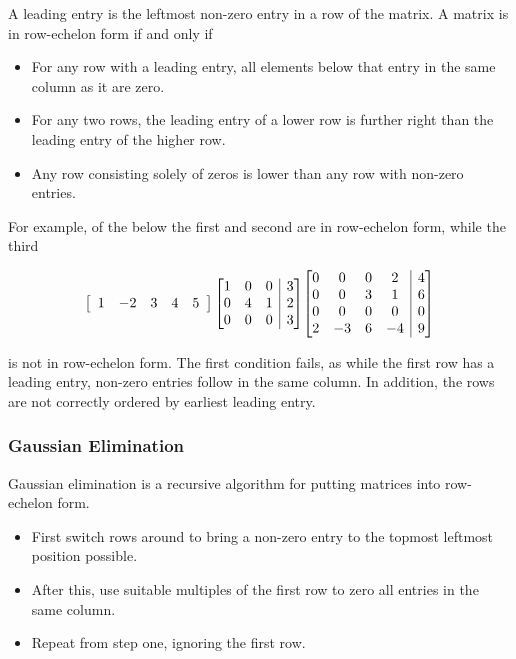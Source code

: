 \documentclass[12pt]{report}
\makeatletter
\newenvironment{amatrix}[1]{
    \left[\begin{array}{@{}*{#1}{c}|c@{}}
}{
    \end{array}\right]
}
\makeatother
\begin{document}
\begin{flushleft}
A leading entry is the leftmost non-zero entry in a row of the matrix. A matrix
is in row-echelon form if and only if
\begin{itemize}
    \item For any row with a leading entry, all elements below that entry in the
        same column as it are zero.
    \item For any two rows, the leading entry of a lower row is further right than
        the leading entry of the higher row.
    \item Any row consisting solely of zeros is lower than any row with non-zero
        entries.
\end{itemize}
For example, of the below the first and second are in row-echelon form, while
the third

\[
    \left[\begin{array}{ccccc}
        1 & -2 & 3 & 4 & 5
    \end{array}\right]
    \begin{amatrix}{3}
        1 & 0 & 0 & 3 \\
        0 & 4 & 1 & 2 \\
        0 & 0 & 0 & 3 \\
    \end{amatrix}
    \begin{amatrix}{4}
        0 & 0 & 0 & 2 & 4 \\
        0 & 0 & 3 & 1 & 6 \\
        0 & 0 & 0 & 0 & 0 \\
        2 & -3 & 6 & -4 & 9 \\
    \end{amatrix}
\]

is not in row-echelon form. The first condition fails, as while the first row
has a leading entry, non-zero entries follow in the same column. In addition,
the rows are not correctly ordered by earliest leading entry.

\subsubsection*{Gaussian Elimination}

Gaussian elimination is a recursive algorithm for putting matrices into
row-echelon form. 

\begin{itemize}
    \item First switch rows around to bring a non-zero entry to the topmost
        leftmost position possible.
    \item After this, use suitable multiples of the first row to zero all
        entries in the same column.
    \item Repeat from step one, ignoring the first row.
\end{itemize}


\end{flushleft}
\end{document}
